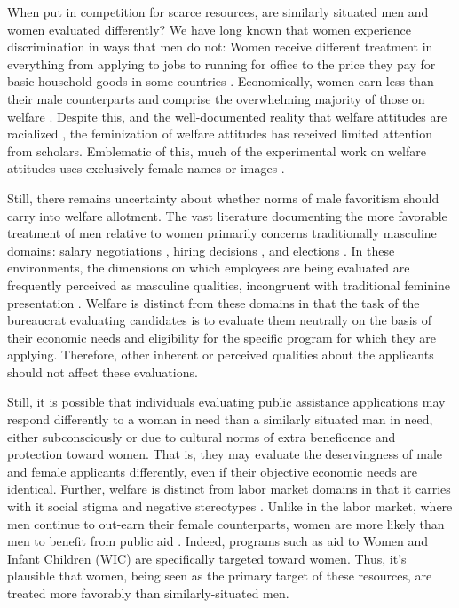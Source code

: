 \documentclass[12pt]{article}%
\begin{document}
\begin{doublespace}
When put in competition for scarce resources, are similarly situated men and women evaluated differently? We have long known that women experience discrimination in ways that men do not: Women receive different treatment in everything from applying to jobs \citep{quadlin_market} to running for office \citep{hassell_partys_2019} to the price they pay for basic household goods in some countries \citep{betz_womens_2021}. Economically, women earn less than their male counterparts \citep{mandel_up_2013} and comprise the overwhelming majority of those on welfare \citep{abramovitz_regulating_2017, fraser_women_1989}. Despite this, and the well-documented reality that welfare attitudes are racialized \citep{desante_working_2013, winter_beyond_2006, gilliam_welfare_1999}, the feminization of welfare attitudes has received limited attention from scholars. Emblematic of this, much of the experimental work on welfare attitudes uses exclusively female names or images \citep{desante_working_2013, winter_beyond_2006, gilliam_welfare_1999, goren_pliable_2022}.


Still, there remains uncertainty about whether norms of male favoritism should carry into welfare allotment. The vast literature documenting the more favorable treatment of men relative to women primarily concerns traditionally masculine domains: salary negotiations \citep{castillo_gender_2013}, hiring decisions \citep{neumark_sex_1996, goldin_orchestrating_2000}, and elections \citep{clayton_how_2020}. In these environments, the dimensions on which employees are being evaluated are frequently perceived as masculine qualities, incongruent with traditional feminine presentation \citep{koenig_are_2011}. Welfare is distinct from these domains in that the task of the bureaucrat evaluating candidates is to evaluate them neutrally on the basis of their economic needs and eligibility for the specific program for which they are applying. Therefore, other inherent or perceived qualities about the applicants should not affect these evaluations. 

Still, it is possible that individuals evaluating public assistance applications may respond differently to a woman in need than a similarly situated man in need, either subconsciously or due to cultural norms of extra beneficence and protection toward women. That is, they may evaluate the deservingness of male and female applicants differently, even if their objective economic needs are identical. Further, welfare is distinct from labor market domains in that it carries with it social stigma \citep{soss_lessons_1999} and negative stereotypes \citep{foster_welfare_2008, esping-andersen_welfare_2015}. Unlike in the labor market, where men continue to out-earn their female counterparts, women are more likely than men to benefit from public aid \citep{fraser_women_1989, lundberg-love_women_2012}. Indeed, programs such as aid to Women and Infant Children (WIC) are specifically targeted toward women. Thus, it’s plausible that women, being seen as the primary target of these resources, are treated more favorably than similarly-situated men.



\end{doublespace}
\end{document}
